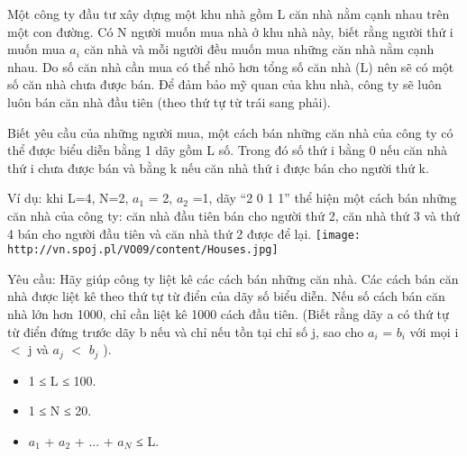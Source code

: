 Một công ty đầu tư xây dựng một khu nhà gồm L căn nhà nằm cạnh nhau trên một con đường. Có N người muốn mua nhà ở khu nhà này, biết rằng người thứ i muốn mua $a_{i}$        căn nhà và mỗi người đều muốn mua những căn nhà nằm cạnh nhau. Do số căn nhà cần mua có thể nhỏ hơn tổng số căn nhà (L) nên sẽ có một số căn nhà chưa được bán. Để đảm bảo mỹ quan của khu nhà, công ty sẽ luôn luôn bán căn nhà đầu tiên (theo thứ tự từ trái sang phải).       

        Biết yêu cầu của những người mua, một cách bán những căn nhà của công ty có thể được biểu diễn bằng 1 dãy gồm L số. Trong đó số thứ i bằng 0 nếu căn nhà thứ i chưa được bán và bằng k nếu căn nhà thứ i được bán cho người thứ k.       

        Ví dụ: khi L=4, N=2, $a_{1}$        = 2, $a_{2}$        =1, dãy “2 0 1 1” thể hiện một cách bán những căn nhà của công ty: căn nhà đầu tiên bán cho người thứ 2, căn nhà thứ 3 và thứ 4 bán cho người đầu tiên và căn nhà thứ 2 được để lại.       
\texttt{[image: http://vn.spoj.pl/VO09/content/Houses.jpg]}



   Yêu cầu: Hãy giúp công ty liệt kê các cách bán những căn nhà. Các cách bán căn nhà được liệt kê theo thứ tự từ điển của dãy số biểu diễn. Nếu số cách bán căn nhà lớn hơn 1000, chỉ cần liệt kê 1000 cách đầu tiên. (Biết rằng dãy a có thứ tự từ điển đứng trước dãy b nếu và chỉ nếu tồn tại chỉ số j, sao cho $a_{i}$   = $b_{i}$   với mọi i $<$ j và $a_{j}$   $<$ $b_{j}$   ).
\begin{itemize}
	\item     1 ≤ L ≤ 100.   
	\item     1 ≤ N ≤ 20.   
	\item     $a_{1}$    + $a_{2}$    + ... + $a_{N}$    ≤ L.   
\end{itemize}